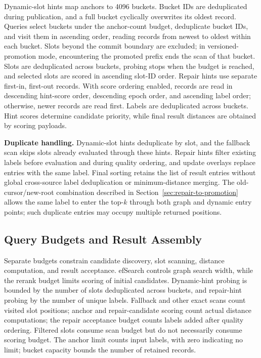 \documentclass[sigconf,pbalance]{acmart}
\begin{document}
Dynamic-slot hints map anchors to 4096 buckets. Bucket IDs are deduplicated during publication, and a full bucket cyclically overwrites its oldest record. Queries select buckets under the anchor-count budget, deduplicate bucket IDs, and visit them in ascending order, reading records from newest to oldest within each bucket. Slots beyond the commit boundary are excluded; in versioned-promotion mode, encountering the promoted prefix ends the scan of that bucket. Slots are deduplicated across buckets, probing stops when the budget is reached, and selected slots are scored in ascending slot-ID order. Repair hints use separate first-in, first-out records. With score ordering enabled, records are read in descending hint-score order, descending epoch order, and ascending label order; otherwise, newer records are read first. Labels are deduplicated across buckets. Hint scores determine candidate priority, while final result distances are obtained by scoring payloads.

\textbf{Duplicate handling.} Dynamic-slot hints deduplicate by slot, and the fallback scan skips slots already evaluated through these hints. Repair hints filter existing labels before evaluation and during quality ordering, and update overlays replace entries with the same label. Final sorting retains the list of result entries without global cross-source label deduplication or minimum-distance merging. The old-cursor/new-root combination described in Section~\ref{sec:repair-to-promotion} allows the same label to enter the top-$k$ through both graph and dynamic entry points; such duplicate entries may occupy multiple returned positions.

\subsection{Query Budgets and Result Assembly}
\label{sec:query-budgets}

Separate budgets constrain candidate discovery, slot scanning, distance computation, and result acceptance. efSearch controls graph search width, while the rerank budget limits scoring of initial candidates. Dynamic-hint probing is bounded by the number of slots deduplicated across buckets, and repair-hint probing by the number of unique labels. Fallback and other exact scans count visited slot positions; anchor and repair-candidate scoring count actual distance computations; the repair acceptance budget counts labels added after quality ordering. Filtered slots consume scan budget but do not necessarily consume scoring budget. The anchor limit counts input labels, with zero indicating no limit; bucket capacity bounds the number of retained records.
\end{document}
